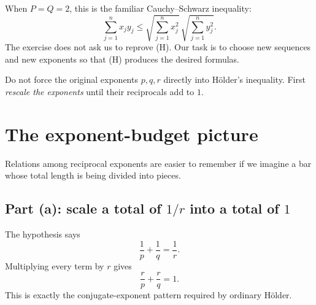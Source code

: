 \documentclass[11pt]{article}
\begin{document}
When \(P=Q=2\), this is the familiar Cauchy--Schwarz inequality:
\[
  \sum_{j=1}^{n}x_jy_j
  \leq
  \sqrt{\sum_{j=1}^{n}x_j^2}\,
  \sqrt{\sum_{j=1}^{n}y_j^2}.
\]
The exercise does not ask us to reprove (H). Our task is to choose new sequences and new exponents so that (H) produces the desired formulas.

\begin{ideaBox}
Do not force the original exponents \(p,q,r\) directly into H\"older's inequality. First \emph{rescale the exponents} until their reciprocals add to \(1\).
\end{ideaBox}

\section{The exponent-budget picture}

Relations among reciprocal exponents are easier to remember if we imagine a bar whose total length is being divided into pieces.

\subsection{Part (a): scale a total of \(1/r\) into a total of \(1\)}

The hypothesis says
\[
  \frac1p+\frac1q=\frac1r.
\]
Multiplying every term by \(r\) gives
\[
  \frac{r}{p}+\frac{r}{q}=1.
  \tag{7}
\]
This is exactly the conjugate-exponent pattern required by ordinary H\"older.

\begin{center}
\end{center}
\end{document}
